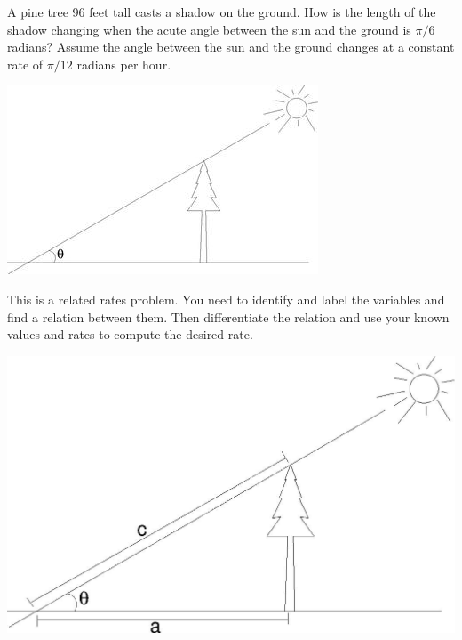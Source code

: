 \documentclass{ximera}
\author{Emma Smith Zbarsky}
\begin{document}
\begin{exercise}

A pine tree 96 feet tall casts a shadow on the ground. How is the length
of the shadow changing when the acute angle between the sun and the
ground is $\pi/6$ radians? Assume the angle between the sun and the
ground changes at a constant rate of $\pi/12$ radians per hour.



\begin{image}\includegraphics{relatedrates-tree.jpg}\end{image}


\begin{hint}
This is a related rates problem. You need to identify and label the
variables and find a relation between them. Then differentiate the
relation and use your known values and rates to compute the desired
rate.
\end{hint}


\begin{hint}
\begin{image}\includegraphics{rr-tree-labeled.jpg}\end{image}




\end{hint}
\end{exercise}
\end{document}
